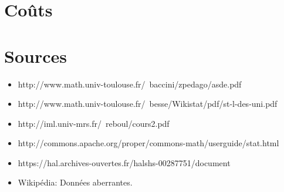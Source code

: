 	\section{Coûts}
		
	\newpage\section{Sources}
		\begin{itemize}
		\item http://www.math.univ-toulouse.fr/~baccini/zpedago/asde.pdf
		\item http://www.math.univ-toulouse.fr/~besse/Wikistat/pdf/st-l-des-uni.pdf
		\item http://iml.univ-mrs.fr/~reboul/cours2.pdf
		\item http://commons.apache.org/proper/commons-math/userguide/stat.html
		\item https://hal.archives-ouvertes.fr/halshs-00287751/document
		\item Wikipédia: Données aberrantes.
		\end{itemize}
		
	

